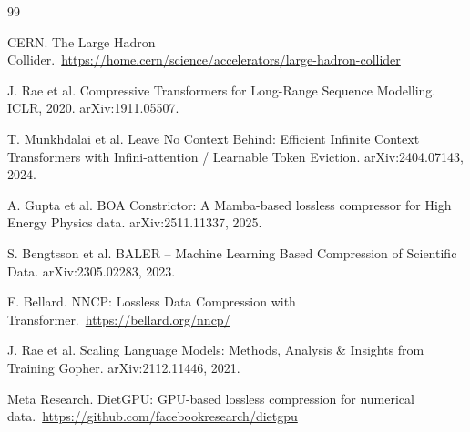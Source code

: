 \documentclass[10pt,twocolumn]{article}
\begin{document}

\begin{thebibliography}{99}

CERN. The Large Hadron Collider.\
\url{https://home.cern/science/accelerators/large-hadron-collider}

J. Rae et al. Compressive Transformers for Long-Range Sequence Modelling. ICLR, 2020. arXiv:1911.05507.

T. Munkhdalai et al. Leave No Context Behind: Efficient Infinite Context Transformers with Infini-attention / Learnable Token Eviction. arXiv:2404.07143, 2024.

A. Gupta et al. BOA Constrictor: A Mamba-based lossless compressor for High Energy Physics data. arXiv:2511.11337, 2025.

S. Bengtsson et al. BALER -- Machine Learning Based Compression of Scientific Data. arXiv:2305.02283, 2023.

F. Bellard. NNCP: Lossless Data Compression with Transformer.\
\url{https://bellard.org/nncp/}

J. Rae et al. Scaling Language Models: Methods, Analysis \& Insights from Training Gopher. arXiv:2112.11446, 2021.

\bibitem{dietgpu}
Meta Research. DietGPU: GPU-based lossless compression for numerical data.\
\url{https://github.com/facebookresearch/dietgpu}

\end{thebibliography}
\end{document}
